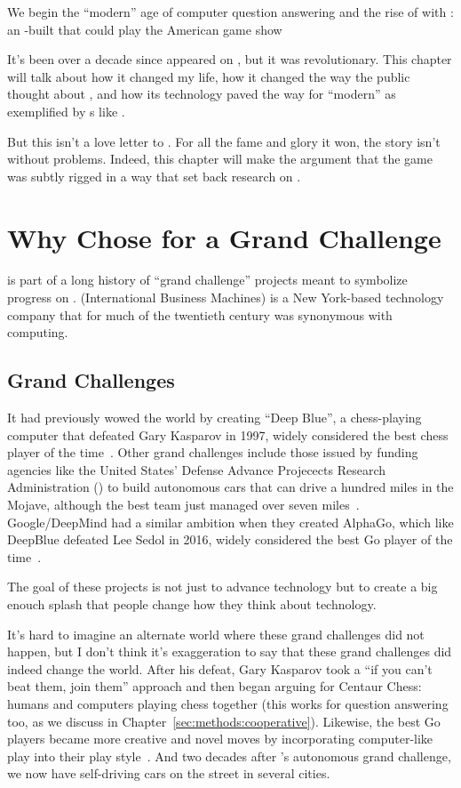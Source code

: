 
We begin the ``modern'' age of computer question answering and the rise of
 with \watson{}: an -built  that could play the
American game show \jeopardyf{}

It's been over a decade since \watson{} appeared on , but it was
revolutionary.  This chapter will talk about how it changed my life, how it
changed the way the public thought about , and how its technology
paved the way for ``modern''  as exemplified by \mm{}s like .

But this isn't a love letter to \watson{}.  For all the fame and glory it won, the
\watson{} story isn't without problems.  Indeed, this chapter will make the
argument that the game was subtly rigged in a way that set back research on
.

\section{Why  Chose \jeopardy{} for a Grand Challenge}

\watson{} is part of a long history of ``grand challenge'' projects meant to
symbolize progress on .
%
 (International Business Machines) is a New York-based technology
company that for much of the twentieth century was synonymous with computing.

\subsection{Grand Challenges}
\label{sec:grand-challenge}

It had previously wowed the world by creating ``Deep Blue'', a chess-playing
computer that defeated Gary Kasparov in 1997, widely considered the best chess
player of the time~\citep{hsu-02}.
%
Other  grand challenges include those issued by funding agencies like
the United States' Defense Advance Projecects Research Administration
() to build autonomous cars that can drive a hundred miles
in the Mojave, although the best team just managed over seven miles~\citep{patterson-05}.
%
Google/DeepMind had a similar ambition when they created AlphaGo, which like
DeepBlue defeated Lee Sedol in 2016, widely considered the best Go player of the time~\citep{koch-16}.

The goal of these projects is not just to advance technology but to create a
big enouch splash that people change how they think about technology.

It's hard to imagine an alternate world where these grand challenges did not
happen, but I don't think it's exaggeration to say that these grand challenges
did indeed change the world.  
%
After his defeat, Gary Kasparov took a ``if you can't beat them, join them''
approach and then began arguing for Centaur Chess: humans and computers
playing chess together (this works for question answering too, as we discuss
in Chapter~\ref{sec:methods:cooperative}).
%
Likewise, the best Go players became more creative and novel moves by 
incorporating computer-like play into their play style~\cite{shin-23}.
%
And two decades after 's autonomous grand challenge, we now have
self-driving cars on the street in several  cities.

